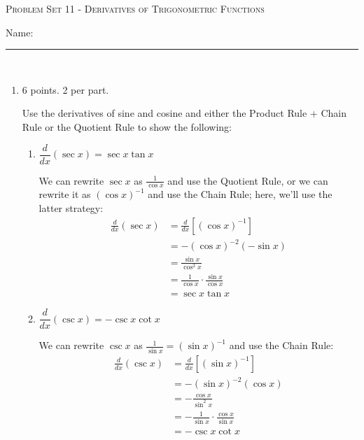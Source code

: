 \documentclass{article}
\begin{document}
\begin{center}
  \large\textsc{Problem Set 11 - Derivatives of Trigonometric Functions}
  
      \pspace{12pt}
  \begin{problemonly}\large Name: \rule{5cm}{0.15mm}\\ \end{problemonly}
\end{center}

\begin{enumerate}

\item 

\begin{grading}
6 points. 2 per part.
\end{grading}

Use the derivatives of sine and cosine and either the Product Rule +
  Chain Rule or the Quotient Rule to show the following:
  \probonly{}
    \begin{enumerate}
    \item
      \begin{problem}[\vfill]
        $\dfrac{d}{dx} (\sec x) = \sec x \tan x$
      \end{problem}

      \begin{solution}
        We can rewrite $\sec x$ as $\frac{1}{\cos x}$ and use the Quotient
        Rule, or we can rewrite it as $(\cos x)^{-1}$ and use the Chain
        Rule; here, we'll use the latter strategy:
        \begin{align*}
          \frac{d}{dx} (\sec x) &= \frac{d}{dx} \left[ (\cos x)^{-1}
          \right] \\
          &= - (\cos x)^{-2} (-\sin x) \\
          &= \frac{\sin x}{\cos^2 x} \\
          &= \frac{1}{\cos x} \cdot \frac{\sin x}{\cos x} \\
          &= \sec x \tan x
        \end{align*}
      \end{solution}

    \item
      \begin{problem}[\vfill]
        $\dfrac{d}{dx} (\csc x) = -\csc x \cot x$
      \end{problem}

      \begin{solution}
        We can rewrite $\csc x$ as $\frac{1}{\sin x} = (\sin x)^{-1}$ and
        use the Chain Rule:
        \begin{align*}
          \frac{d}{dx} (\csc x) &= \frac{d}{dx} \left[ (\sin x)^{-1}
          \right] \\
          &= - (\sin x)^{-2} (\cos x) \\
          &= - \frac{\cos x}{\sin^2 x} \\
          &= - \frac{1}{\sin x} \cdot \frac{\cos x}{\sin x} \\
          &= - \csc x \cot x
        \end{align*}
      \end{solution}


\end{enumerate}
\end{enumerate}
\end{document}
